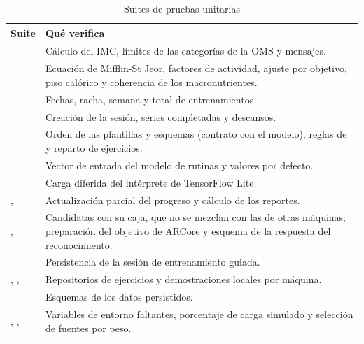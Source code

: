 \begin{table}[H]
\centering
\caption{Suites de pruebas unitarias}
\label{tab:suites-jest}
\small
\begin{tabularx}{\textwidth}{|L{5.0cm}|Y|}
\hline
{} \textbf{Suite} & \textbf{Qué verifica} \\
\hline
{} & Cálculo del IMC, límites de las categorías de la
OMS y mensajes. \\ \hline
{} & Ecuación de Mifflin-St Jeor, factores de actividad,
ajuste por objetivo, piso calórico y coherencia de los macronutrientes. \\ \hline
{} & Fechas, racha, semana y total de entrenamientos. \\ \hline
{} & Creación de la sesión, series completadas y
descansos. \\ \hline
{} & Orden de las plantillas y esquemas (contrato con el
modelo), reglas de  y reparto de ejercicios. \\ \hline
{} & Vector de entrada del modelo de rutinas y valores por
defecto. \\ \hline
{} & Carga diferida del intérprete de TensorFlow Lite. \\ \hline
{},  & Actualización
parcial del progreso y cálculo de los reportes. \\ \hline
{},  & Candidatas con su
caja, que no se mezclan con las de otras máquinas; preparación del objetivo de
ARCore y esquema de la respuesta del reconocimiento. \\ \hline
{} & Persistencia de la sesión de entrenamiento
guiada. \\ \hline
{}, ,
 & Repositorios de ejercicios y
demostraciones locales por máquina. \\ \hline
{} & Esquemas de los datos persistidos. \\ \hline
{}, ,  &
Variables de entorno faltantes, porcentaje de carga simulado y selección de
fuentes por peso. \\
\hline
\end{tabularx}
\end{table}
